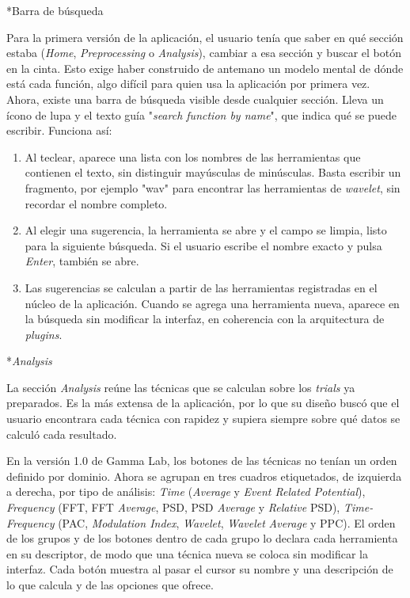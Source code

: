 \documentclass[12pt,letterpaper,oneside]{article}
\makeatletter
\newcommand{\subsubsubsection}[1]{%
  \@startsection{paragraph}{4}{\z@}{10pt plus 2pt minus 1pt}{4pt}%
    {\normalfont\normalsize\bfseries\itshape}*{#1}}
\makeatother
\begin{document}
\subsubsubsection{Barra de búsqueda}

Para la primera versión de la aplicación, el usuario tenía que saber en qué sección estaba (\textit{Home}, \textit{Preprocessing} o \textit{Analysis}), cambiar a esa sección y buscar el botón en la cinta. Esto exige haber construido de antemano un modelo mental de dónde está cada función, algo difícil para quien usa la aplicación por primera vez. Ahora, existe una barra de búsqueda visible desde cualquier sección. Lleva un ícono de lupa y el texto guía "\textit{search function by name}", que indica qué se puede escribir. Funciona así:

\begin{enumerate}
    \item Al teclear, aparece una lista con los nombres de las herramientas que contienen el texto, sin distinguir mayúsculas de minúsculas. Basta escribir un fragmento, por ejemplo "wav" para encontrar las herramientas de \textit{wavelet}, sin recordar el nombre completo.

    \item Al elegir una sugerencia, la herramienta se abre y el campo se limpia, listo para la siguiente búsqueda. Si el usuario escribe el nombre exacto y pulsa \textit{Enter}, también se abre.

    \item Las sugerencias se calculan a partir de las herramientas registradas en el núcleo de la aplicación. Cuando se agrega una herramienta nueva, aparece en la búsqueda sin modificar la interfaz, en coherencia con la arquitectura de \textit{plugins}.
\end{enumerate}

\subsubsubsection{\textit{Analysis}}

La sección \textit{Analysis} reúne las técnicas que se calculan sobre los \textit{trials} ya preparados. Es la más extensa de la aplicación, por lo que su diseño buscó que el usuario encontrara cada técnica con rapidez y supiera siempre sobre qué datos se calculó cada resultado.

En la versión 1.0 de Gamma Lab, los botones de las técnicas no tenían un orden definido por dominio. Ahora se agrupan en tres cuadros etiquetados, de izquierda a derecha, por tipo de análisis: \textit{Time} (\textit{Average} y \textit{Event Related Potential}), \textit{Frequency} (FFT, FFT \textit{Average}, PSD, PSD \textit{Average} y \textit{Relative} PSD), \textit{Time-Frequency} (PAC, \textit{Modulation Index}, \textit{Wavelet}, \textit{Wavelet} \textit{Average} y PPC). El orden de los grupos y de los botones dentro de cada grupo lo declara cada herramienta en su descriptor, de modo que una técnica nueva se coloca sin modificar la interfaz. Cada botón muestra al pasar el cursor su nombre y una descripción de lo que calcula y de las opciones que ofrece.
\end{document}
